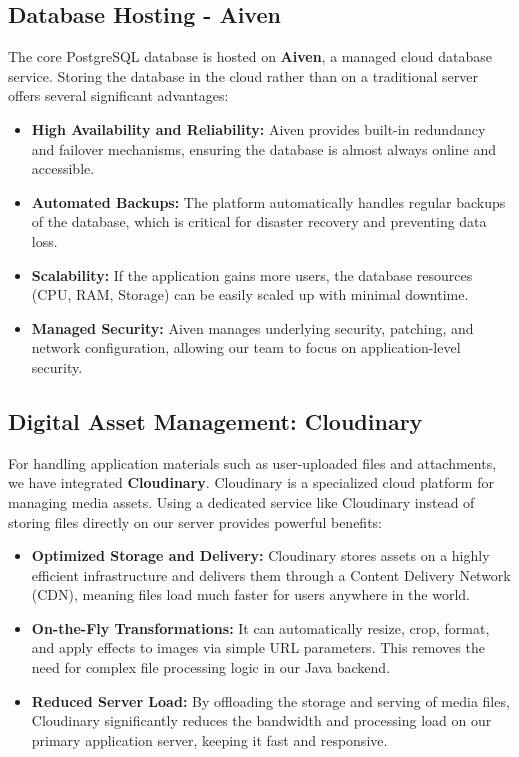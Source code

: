\documentclass[12pt, a4paper]{report}
\begin{document}
\subsection{Database Hosting - Aiven}
The core PostgreSQL database is hosted on \textbf{Aiven}, a managed cloud database service. Storing the database in the cloud rather than on a traditional server offers several significant advantages:
\begin{itemize}
    \item \textbf{High Availability and Reliability:} Aiven provides built-in redundancy and failover mechanisms, ensuring the database is almost always online and accessible.
    \item \textbf{Automated Backups:} The platform automatically handles regular backups of the database, which is critical for disaster recovery and preventing data loss.
    \item \textbf{Scalability:} If the application gains more users, the database resources (CPU, RAM, Storage) can be easily scaled up with minimal downtime.
    \item \textbf{Managed Security:} Aiven manages underlying security, patching, and network configuration, allowing our team to focus on application-level security.
\end{itemize}

\subsection{Digital Asset Management: Cloudinary}
For handling application materials such as user-uploaded files and attachments, we have integrated \textbf{Cloudinary}. Cloudinary is a specialized cloud platform for managing media assets. Using a dedicated service like Cloudinary instead of storing files directly on our server provides powerful benefits:
\begin{itemize}
    \item \textbf{Optimized Storage and Delivery:} Cloudinary stores assets on a highly efficient infrastructure and delivers them through a Content Delivery Network (CDN), meaning files load much faster for users anywhere in the world.
    \item \textbf{On-the-Fly Transformations:} It can automatically resize, crop, format, and apply effects to images via simple URL parameters. This removes the need for complex file processing logic in our Java backend.
    \item \textbf{Reduced Server Load:} By offloading the storage and serving of media files, Cloudinary significantly reduces the bandwidth and processing load on our primary application server, keeping it fast and responsive.
\end{itemize}
\end{document}

